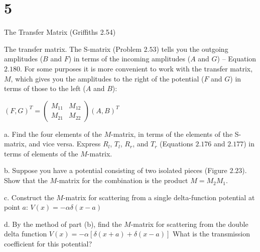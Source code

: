 \documentclass{article}
\begin{document}
\section*{5}
\begin{ques}
The Transfer Matrix (Griffiths 2.54)

The transfer matrix. The S-matrix (Problem $2.53$) tells you the outgoing amplitudes ($B$ and $F$) in terms of the incoming amplitudes ($A$ and $G$) – Equation $2.180$. For some purposes it is more convenient to work with the transfer matrix, $M$, which gives you the amplitudes to the right of the potential ($F$ and $G$) in terms of those to the left ($A$ and $B$):

$(F, G)^T = \begin{pmatrix} M_{11} & M_{12} \\ M_{21} & M_{22} \end{pmatrix} (A, B)^T$

a. Find the four elements of the $M$-matrix, in terms of the elements of the S-matrix, and vice versa. Express $R_l$, $T_l$, $R_r$, and $T_r$ (Equations $2.176$ and $2.177$) in terms of elements of the $M$-matrix.

b. Suppose you have a potential consisting of two isolated pieces (Figure $2.23$). Show that the $M$-matrix for the combination is the product $M = M_2 M_1$.

c. Construct the $M$-matrix for scattering from a single delta-function potential at point $a$:  
$V(x) = -\alpha \delta(x-a)$

d. By the method of part (b), find the $M$-matrix for scattering from the double delta function  
$V(x) = -\alpha [\delta(x+a) + \delta(x-a)]$  
What is the transmission coefficient for this potential?
\end{ques}
\end{document}
